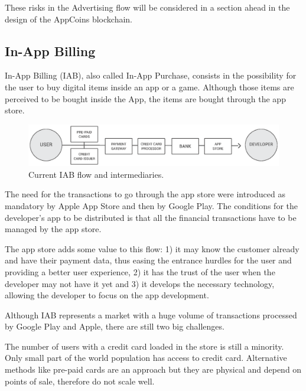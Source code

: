 These risks in the Advertising flow will be considered in a section ahead in the design of the AppCoins blockchain.


\subsection{In-App Billing}
\label{subsec:intro_iab}


In-App Billing (IAB), also called In-App Purchase, consists in the possibility for the user to buy digital items inside an app or a game. Although those items are perceived to be bought inside the App, the items are bought through the app store.

\begin{figure}[!ht]
\centering
\includegraphics[width=\textwidth]{diagrams/iab_flow.eps}
\caption{Current IAB flow and intermediaries.}
\label{fig:iab_flow}
\end{figure}


The need for the transactions to go through the app store were introduced as mandatory by Apple App Store and then by Google Play. The conditions for the developer's app to be distributed is that all the financial transactions have to be managed by the app store. 

\medskip

The app store adds some value to this flow: 1) it may know the customer already and have their payment data, thus easing the entrance hurdles for the user and providing a better user experience, 2) it has the trust of the user when the developer may not have it yet and 3) it develops the necessary technology, allowing the developer to focus on the app development.

\medskip

Although IAB represents a market with a huge volume of transactions processed by Google Play and Apple, there are still two big challenges.


\medskip

The number of users with a credit card loaded in the store is still a minority. Only small part of the world population has access to credit card. Alternative methods like pre-paid cards are an approach but they are physical and depend on points of sale, therefore do not scale well.

